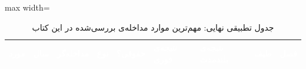 \begin{landscape}
\begin{table}[htbp]
\centering
\caption{جدول تطبیقی نهایی: مهم‌ترین موارد مداخله‌ی بررسی‌شده در این کتاب}
\label{tab:ch14-master}
\begin{adjustbox}{max width=\linewidth}
\begin{tabularx}{\linewidth}{
    >{\raggedleft\arraybackslash}p{2cm}
    >{\centering\arraybackslash}p{1cm}
    >{\raggedleft\arraybackslash}p{2cm}
    >{\raggedleft\arraybackslash}p{1.5cm}
    >{\centering\arraybackslash}p{0.8cm}
    >{\raggedleft\arraybackslash}p{2cm}
    >{\raggedleft\arraybackslash}p{2.5cm}
    >{\centering\arraybackslash}p{0.8cm}
    >{\centering\arraybackslash}p{0.8cm}
}
\toprule
\rowcolor{PrimaryDeep}
\textcolor{white}{\textbf{مورد}} &
\textcolor{white}{\textbf{سال}} &
\textcolor{white}{\textbf{مداخله‌گر}} &
\textcolor{white}{\textbf{نوع}} &
\textcolor{white}{\textbf{حقوقی؟}} &
\textcolor{white}{\textbf{نتیجه‌ی فوری}} &
\textcolor{white}{\textbf{نتیجه‌ی بلندمدت}} &
\textcolor{white}{\textbf{طیف}} &
\textcolor{white}{\textbf{فصل}} \\
\midrule


\end{tabularx}
\end{adjustbox}
\end{table}
\end{landscape}
